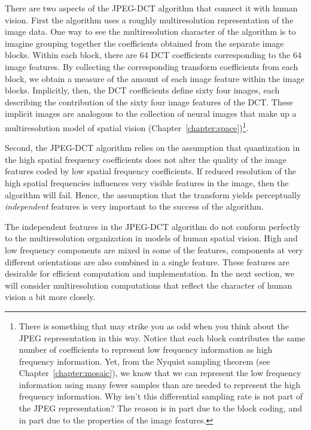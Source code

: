 There are two aspects of the JPEG-DCT algorithm that connect it with human
vision.  First the algorithm uses a roughly multiresolution
representation of the image data.  One way to see the multiresolution
character of the algorithm is to imagine grouping together the
coefficients obtained from the separate image blocks.  Within each
block, there are 64 DCT coefficients corresponding to the 64 image
features.  By collecting the corresponding transform coefficients from
each block, we obtain a measure of the amount of each image feature
within the image blocks.  Implicitly, then, the DCT coefficients
define sixty four images, each describing the contribution of the
sixty four image features of the DCT.  These implicit images are
analogous to the collection of neural images that make up a
multiresolution model of spatial vision
(Chapter~\ref{chapter:space})\footnote{ There is something that may
strike you as odd when you think about the JPEG representation in this
way.  Notice that each block contributes the same number of
coefficients to represent low frequency information as high frequency
information.  Yet, from the Nyquist sampling theorem (see
Chapter~\ref{chapter:mosaic}), we know that we can represent the low
frequency information using many fewer samples than are needed to
represent the high frequency information.  Why isn't this differential
sampling rate is not part of the JPEG representation?  The reason is
in part due to the block coding, and in part due to the properties of
the image features.}.

Second, the JPEG-DCT algorithm relies on the assumption
that quantization in the high spatial frequency coefficients does not
alter the quality of the image features coded by low spatial frequency
coefficients.  If reduced resolution of the high spatial frequencies
influences very visible features in the image, then the algorithm will
fail.  Hence, the assumption that the transform yields perceptually
{\em independent} features is very important to the success of the
algorithm.

The independent features in the JPEG-DCT algorithm do not conform perfectly
to the multiresolution organization in models of human spatial vision.
High and low frequency components are mixed in some of the features,
components at very different orientations are also combined in a
single feature.  These features are desirable for efficient
computation and implementation.  In the next section, we will consider
multiresolution computations that reflect the character of human
vision a bit more closely.

